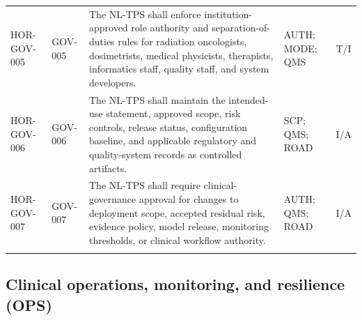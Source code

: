 \documentclass[11pt,letterpaper]{article}
\begin{document}
\begin{scriptsize}
\begin{longtable}{@{}L{0.14\textwidth}L{0.09\textwidth}L{0.47\textwidth}L{0.15\textwidth}L{0.07\textwidth}@{}}
\addlinespace[2pt]
\mbox{HOR-GOV-005} & \mbox{GOV-005} & The NL-TPS shall enforce institution-approved role authority and separation-of-duties rules for radiation oncologists, dosimetrists, medical physicists, therapists, informatics staff, quality staff, and system developers. & AUTH; MODE; QMS & T\slash\allowbreak{}I \\
\addlinespace[2pt]
\mbox{HOR-GOV-006} & \mbox{GOV-006} & The NL-TPS shall maintain the intended-use statement, approved scope, risk controls, release status, configuration baseline, and applicable regulatory and quality-system records as controlled artifacts. & SCP; QMS; ROAD & I\slash\allowbreak{}A \\
\addlinespace[2pt]
\mbox{HOR-GOV-007} & \mbox{GOV-007} & The NL-TPS shall require clinical-governance approval for changes to deployment scope, accepted residual risk, evidence policy, model release, monitoring thresholds, or clinical workflow authority. & AUTH; QMS; ROAD & I\slash\allowbreak{}A \\
\addlinespace[2pt]
\end{longtable}
\end{scriptsize}

\subsection{Clinical operations, monitoring, and resilience (OPS)}
\end{document}
